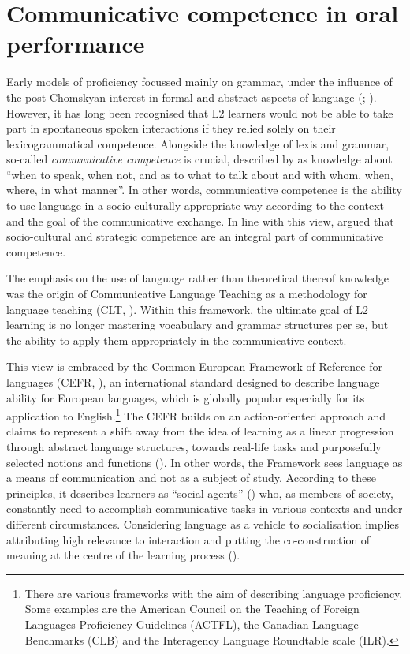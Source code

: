 \section{Communicative competence in oral performance}
\label{sec:1.1}
Early models of proficiency focussed mainly on grammar, under the influence of the post-Chomskyan interest in formal and abstract aspects of language (\citealt{Campbell-Larsen2015}; \citealt{Kramsch1986}). However, it has long been recognised that L2 learners would not be able to take part in spontaneous spoken interactions if they relied solely on their lexicogrammatical competence. Alongside the knowledge of lexis and grammar, so-called \textit{communicative competence} is crucial, described by \citet[277]{Hymes1972} as knowledge about “when to speak, when not, and as to what to talk about and with whom, when, where, in what manner”. In other words, communicative competence is the ability to use language in a socio-culturally appropriate way according to the context and the goal of the communicative exchange. In line with this view, \citet{CanaleSwain1980} argued that socio-cultural and strategic competence are an integral part of communicative competence.

The emphasis on the use of language rather than theoretical thereof knowledge was the origin of Communicative Language Teaching as a methodology for language teaching (CLT, \citealt{Savignon1991}). Within this framework, the ultimate goal of L2 learning is no longer mastering vocabulary and grammar structures per se, but the ability to apply them appropriately in the communicative context.

This view is embraced by the Common European Framework of Reference for languages (CEFR, \citealt{CouncilOfEurope2001}), an international standard designed to describe language ability for European languages, which is globally popular especially for its application to English.\footnote{There are various frameworks with the aim of describing language proficiency. Some examples are the American Council on the Teaching of Foreign Languages Proficiency Guidelines (ACTFL), the Canadian Language Benchmarks (CLB) and the Interagency Language Roundtable scale (ILR).}
The CEFR builds on an action-oriented approach and claims to represent a shift away from the idea of learning as a linear progression through abstract language structures, towards real-life tasks and purposefully selected notions and functions (\citealt{GoodierNorth2018}). In other words, the Framework sees language as a means of communication and not as a subject of study. According to these principles, it describes learners as “social agents” (\citealt[9]{CouncilOfEurope2001}) who, as members of society, constantly need to accomplish communicative tasks in various contexts and under different circumstances. Considering language as a vehicle to socialisation implies attributing high relevance to interaction and putting the co-construction of meaning at the centre of the learning process (\citealt{GoodierNorth2018}).

